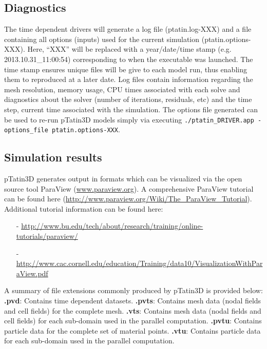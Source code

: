\documentclass[paper=a4, fontsize=11pt,twoside]{scrartcl}
\newcommand{\ptat}{{{\sc pTatin3D}}}
\newcommand{\unix}[1]{\texttt{\footnotesize #1}}
\begin{document}
{{\subsection{Diagnostics}
The time dependent drivers will generate a log file (ptatin.log-XXX) and a file containing all options (inputs) used for the current simulation (ptatin.options-XXX). Here, ``XXX'' will be replaced with a year/date/time stamp (e.g. 2013.10.31\_11:00:54) corresponding to when the executable was launched. The time stamp ensures unique files will be give to each model run, thus enabling them to reproduced at a later date. Log files contain information regarding the mesh resolution, memory usage, CPU times associated with each solve and diagnostics about the solver (number of iterations, residuals, etc) and the time step, current time associated with the simulation. The options file generated can be used to re-run {\ptat} models simply via executing \unix{./ptatin\_DRIVER.app -options\_file ptatin.options-XXX}.

\subsection{Simulation results}
{\ptat} generates output in formats which can be visualized via the open source tool ParaView (\url{www.paraview.org}).
A comprehensive ParaView tutorial can be found here (\url{http://www.paraview.org/Wiki/The\_ParaView\_Tutorial}). 
Additional tutorial information can be found here:
\begin{tiny}
\begin{itemize}
	\item[-] \url{http://www.bu.edu/tech/about/research/training/online-tutorials/paraview/}
	\item[-] \url{http://www.cac.cornell.edu/education/Training/data10/VisualizationWithParaView.pdf}
\end{itemize}
\end{tiny}

A summary of file extensions commonly produced by {\ptat} is provided below: \newline
{\bf *.pvd}: Contains time dependent datasets.  \newline
{\bf *.pvts}: Contains mesh data (nodal fields and cell fields) for the complete mesh.  \newline
{\bf *.vts}: Contains mesh data (nodal fields and cell fields) for each sub-domain used in the parallel computation.  \newline
{\bf *.pvtu}: Contains particle data for the complete set of material points.  \newline
{\bf *.vtu}: Contains particle data for each sub-domain used in the parallel computation. \newline

}}
\end{document}
